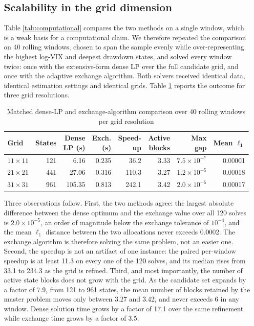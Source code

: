 \documentclass[smallcondensed]{svjour3}
\begin{document}
\subsection{Scalability in the grid dimension}\label{sec:scalability}
Table \ref{tab:computational} compares the two methods on a single window, which is a weak basis for a computational claim. We therefore repeated the comparison on 40 rolling windows, chosen to span the sample evenly while over-representing the highest log-VIX and deepest drawdown states, and solved every window twice: once with the extensive-form dense LP over the full candidate grid, and once with the adaptive exchange algorithm. Both solvers received identical data, identical estimation settings and identical grids. Table \ref{tab:scalability} reports the outcome for three grid resolutions.

\begin{table}[!htbp]
\centering
\caption{Matched dense-LP and exchange-algorithm comparison over 40 rolling windows per grid resolution}
\label{tab:scalability}
\footnotesize
\begin{tabular}{lrrrrrrr}
\toprule
\textbf{Grid} & \textbf{States} & \makecell[r]{\textbf{Dense}\\\textbf{LP (s)}} & \makecell[r]{\textbf{Exch.}\\\textbf{(s)}} & \makecell[r]{\textbf{Speed-}\\\textbf{up}} & \makecell[r]{\textbf{Active}\\\textbf{blocks}} & \makecell[r]{\textbf{Max}\\\textbf{gap}} & \makecell[r]{\textbf{Mean}\\$\boldsymbol{\ell_1}$} \\
\midrule
$11\times11$ & 121 & 6.16 & 0.235 & 36.2 & 3.33 & $7.5\times10^{-7}$ & 0.00001 \\
$21\times21$ & 441 & 27.06 & 0.316 & 110.3 & 3.27 & $1.2\times10^{-5}$ & 0.00018 \\
$31\times31$ & 961 & 105.35 & 0.813 & 242.1 & 3.42 & $2.0\times10^{-5}$ & 0.00017 \\
\bottomrule
\end{tabular}
\end{table}

Three observations follow. First, the two methods agree: the largest absolute difference between the dense optimum and the exchange value over all 120 solves is $2.0\times10^{-5}$, an order of magnitude below the exchange tolerance of $10^{-4}$, and the mean $\ell_1$ distance between the two allocations never exceeds 0.0002. The exchange algorithm is therefore solving the same problem, not an easier one. Second, the speedup is not an artifact of one instance: the paired per-window speedup is at least 11.3 on every one of the 120 solves, and its median rises from 33.1 to 234.3 as the grid is refined. Third, and most importantly, the number of active state blocks does not grow with the grid. As the candidate set expands by a factor of 7.9, from 121 to 961 states, the mean number of blocks retained by the master problem moves only between 3.27 and 3.42, and never exceeds 6 in any window. Dense solution time grows by a factor of 17.1 over the same refinement while exchange time grows by a factor of 3.5.
\end{document}
